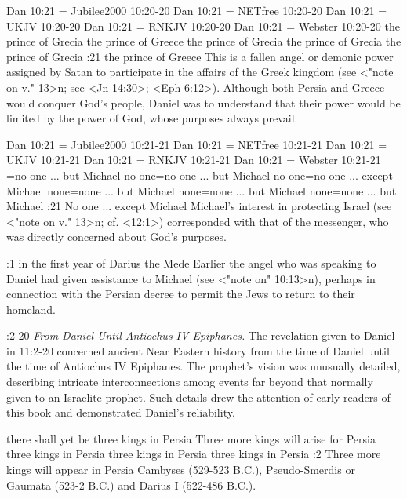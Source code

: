 \renum Dan 10:21 = Jubilee2000 10:20-20
\renum Dan 10:21 = NETfree 10:20-20
\renum Dan 10:21 = UKJV 10:20-20
\renum Dan 10:21 = RNKJV 10:20-20
\renum Dan 10:21 = Webster 10:20-20
    {the prince of Grecia} %
    {the prince of Greece} %
    {the prince of Grecia} %
    {the prince of Grecia} %
    {the prince of Grecia} %
:21 {the prince of Greece} This is a fallen angel or demonic power assigned by Satan to participate in the affairs of 
the Greek kingdom (see <"note on v." 13>n; see <Jn 14:30>; <Eph 6:12>). Although both Persia and Greece would
conquer God's people, Daniel was to understand that their power would be limited by the power of God, whose purposes always prevail.


\renum Dan 10:21 = Jubilee2000 10:21-21
\renum Dan 10:21 = NETfree 10:21-21
\renum Dan 10:21 = UKJV 10:21-21
\renum Dan 10:21 = RNKJV 10:21-21
\renum Dan 10:21 = Webster 10:21-21
={no one ... but Michael} %
    {no one}={no one ... but Michael} %
    {no one}={no one ... except Michael} %
    {none}={none ... but Michael} %
    {none}={none ... but Michael} %
    {none}={none ... but Michael} %
:21 {No one ... except Michael} Michael's 
interest in protecting Israel (see <"note on v." 13>n; cf. <12:1>) corresponded with that of the messenger,
who was directly concerned about  God's purposes.

:1 {in the first year of Darius the Mede} Earlier the angel who 
was speaking to Daniel had given assistance to Michael (see <"note on" 10:13>n), perhaps in connection with the Persian decree to permit 
the Jews to return to their homeland.

:2-20 {} {\it From Daniel Until Antiochus IV Epiphanes.}\/
The revelation given to Daniel in 11:2-20 concerned ancient Near Eastern  history from the time of Daniel until the time of Antiochus IV Epiphanes. 
The prophet's vision was unusually detailed, describing intricate interconnections among events far beyond that normally given to an Israelite prophet. 
Such details drew the attention of early readers of this book and demonstrated Daniel's reliability.

    {there shall yet be three kings in Persia} %
    {Three more kings will arise for Persia} %
    {three kings in Persia} %
    {three kings in Persia} %
    {three kings in Persia} %
:2 {Three more kings will appear in Persia} Cambyses 
(529-523 B.C.), Pseudo-Smerdis or Gaumata (523-2 B.C.) and Darius I (522-486 B.C.). 


